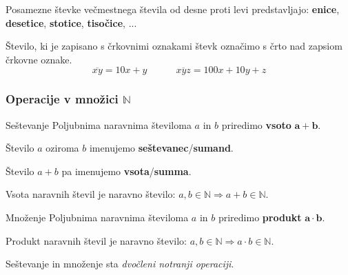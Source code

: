 \begin{frame}
            \begin{block}{}
                Posamezne števke večmestnega števila od desne proti levi predstavljajo: \textbf{enice}, \textbf{desetice}, \textbf{stotice}, \textbf{tisočice}, ...
            \end{block}

            \begin{block}{}
                Število, ki je zapisano s črkovnimi oznakami števk označimo s črto nad zapsiom črkovne oznake.
                $$ \overline{xy}=10x+y \quad \quad \quad \overline{xyz}=100x+10y+z$$
            \end{block}

            
        \end{frame}

        \begin{frame}
            \frametitle{Operacije v množici $\mathbb{N}$}

            \begin{alertblock}{Seštevanje}
                Poljubnima naravnima številoma $a$ in $b$ priredimo \textbf{vsoto} $\mathbf{\mathbf{a+b}}$.
            \end{alertblock}

            \begin{block}{}
                Število $a$ oziroma $b$ imenujemo \textbf{seštevanec}/\textbf{sumand}. 

                Število $a+b$ pa imenujemo \textbf{vsota}/\textbf{summa}. 
            \end{block}

            \begin{block}{}
                Vsota naravnih števil je naravno število: $a, b \in \mathbb{N} \Rightarrow a+b \in \mathbb{N}$.

            \end{block}

        \end{frame}

        \begin{frame}
            \begin{alertblock}{Množenje}
                Poljubnima naravnima številoma $a$ in $b$ priredimo \textbf{produkt} $\mathbf{\mathbf{a\cdot b}}$.
            \end{alertblock}

            \begin{block}{}
                Produkt naravnih števil je naravno število: $a, b \in \mathbb{N} \Rightarrow a\cdot b \in \mathbb{N}$.

            \end{block}

            \begin{block}{}
                Seštevanje in množenje sta \textit{dvočleni notranji operaciji}.
            \end{block}


        \end{frame}

